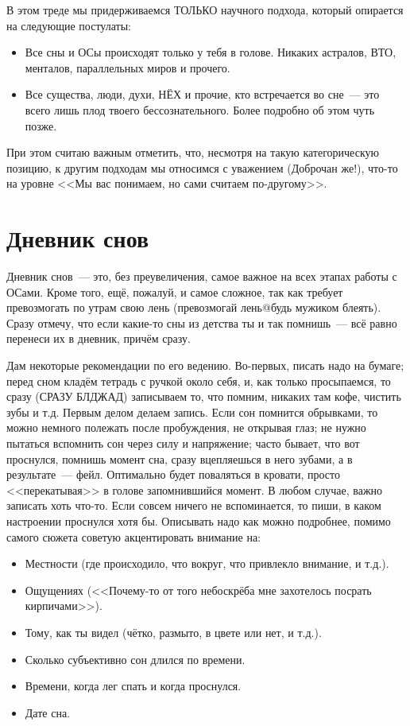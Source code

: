 \documentclass[a4paper,14pt,oneside]{memoir}
\begin{document}
В этом треде мы придерживаемся ТОЛЬКО научного подхода, который опирается на следующие постулаты:
\begin{itemize}
\item Все сны и ОСы происходят только у тебя в голове. Никаких астралов, ВТО, менталов, параллельных миров и прочего. 
\item Все существа, люди, духи, НЁХ и прочие, кто встречается во сне~--- это всего лишь плод твоего бессознательного. Более подробно об этом чуть позже.
\end{itemize}

При этом считаю важным отметить, что, несмотря на такую категорическую позицию, к другим подходам мы относимся с уважением (Доброчан же!), что-то на уровне <<Мы вас понимаем, но сами считаем по-другому>>.


\section{Дневник снов}

Дневник снов~--- это, без преувеличения, самое важное на всех этапах работы с ОСами. Кроме того, ещё, пожалуй, и самое сложное, так как требует превозмогать по утрам свою лень (превозмогай лень@будь мужиком блеять).
Сразу отмечу, что если какие-то сны из детства ты и так помнишь~--- всё равно перенеси их в дневник, причём сразу. 

Дам некоторые рекомендации по его ведению. Во-первых, писать надо на бумаге; перед сном кладём тетрадь с ручкой около себя, и, как только просыпаемся, то сразу (СРАЗУ БЛДЖАД) записываем то, что помним, никаких там кофе, чистить зубы и т.д. Первым делом делаем запись. Если сон помнится обрывками, то можно немного полежать после пробуждения, не открывая глаз; не нужно пытаться вспомнить сон через силу и напряжение; часто бывает, что вот проснулся, помнишь момент сна, сразу вцепляешься в него зубами, а в результате~--- фейл. Оптимально будет поваляться в кровати, просто <<перекатывая>> в голове запомнившийся момент. В любом случае, важно записать хоть что-то. Если совсем ничего не вспоминается, то пиши, в каком настроении проснулся хотя бы.
Описывать надо как можно подробнее, помимо самого сюжета советую акцентировать внимание на:
\begin{itemize}
\item Местности (где происходило, что вокруг, что привлекло внимание, и т.д.).
\item Ощущениях (<<Почему-то от того небоскрёба мне захотелось посрать кирпичами>>).
\item Тому, как ты видел (чётко, размыто, в цвете или нет, и т.д.).
\item Сколько субъективно сон длился по времени.
\item Времени, когда лег спать и когда проснулся.
\item Дате сна.
\end{itemize}
\end{document}

